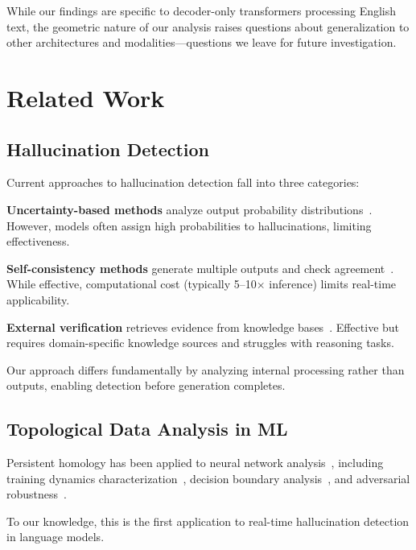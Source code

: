 \documentclass[11pt,twocolumn]{article}
\begin{document}
While our findings are specific to decoder-only transformers processing English text, the geometric nature of our analysis raises questions about generalization to other architectures and modalities---questions we leave for future investigation.

\section{Related Work}

\subsection{Hallucination Detection}

Current approaches to hallucination detection fall into three categories:

\textbf{Uncertainty-based methods} analyze output probability distributions~\cite{kuhn2023semantic,manakul2023selfcheckgpt}. However, models often assign high probabilities to hallucinations, limiting effectiveness.

\textbf{Self-consistency methods} generate multiple outputs and check agreement~\cite{wang2022selfconsistency}. While effective, computational cost (typically 5--10$\times$ inference) limits real-time applicability.

\textbf{External verification} retrieves evidence from knowledge bases~\cite{gao2022pal,press2022measuring}. Effective but requires domain-specific knowledge sources and struggles with reasoning tasks.

Our approach differs fundamentally by analyzing internal processing rather than outputs, enabling detection before generation completes.

\subsection{Topological Data Analysis in ML}

Persistent homology has been applied to neural network analysis~\cite{naitzat2020topology,rieck2019neural}, including training dynamics characterization~\cite{goldfarb2020topological}, decision boundary analysis~\cite{chen2019topological}, and adversarial robustness~\cite{wang2021topological}.

To our knowledge, this is the first application to real-time hallucination detection in language models.
\end{document}

